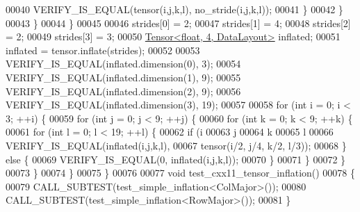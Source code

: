 \begin{DoxyCode}
00040           VERIFY\_IS\_EQUAL(tensor(i,j,k,l), no\_stride(i,j,k,l));
00041         \}
00042       \}
00043     \}
00044   \}
00045 
00046   strides[0] = 2;
00047   strides[1] = 4;
00048   strides[2] = 2;
00049   strides[3] = 3;
00050   \hyperlink{class_eigen_1_1_tensor}{Tensor<float, 4, DataLayout>} inflated;
00051   inflated = tensor.inflate(strides);
00052 
00053   VERIFY\_IS\_EQUAL(inflated.dimension(0), 3);
00054   VERIFY\_IS\_EQUAL(inflated.dimension(1), 9);
00055   VERIFY\_IS\_EQUAL(inflated.dimension(2), 9);
00056   VERIFY\_IS\_EQUAL(inflated.dimension(3), 19);
00057 
00058   \textcolor{keywordflow}{for} (\textcolor{keywordtype}{int} i = 0; i < 3; ++i) \{
00059     \textcolor{keywordflow}{for} (\textcolor{keywordtype}{int} j = 0; j < 9; ++j) \{
00060       \textcolor{keywordflow}{for} (\textcolor{keywordtype}{int} k = 0; k < 9; ++k) \{
00061         \textcolor{keywordflow}{for} (\textcolor{keywordtype}{int} l = 0; l < 19; ++l) \{
00062           \textcolor{keywordflow}{if} (i %
00063               j %
00064               k %
00065               l %
00066             VERIFY\_IS\_EQUAL(inflated(i,j,k,l),
00067                             tensor(i/2, j/4, k/2, l/3));
00068           \} \textcolor{keywordflow}{else} \{
00069             VERIFY\_IS\_EQUAL(0, inflated(i,j,k,l));
00070           \}
00071         \}
00072       \}
00073     \}
00074   \}
00075 \}
00076 
00077 \textcolor{keywordtype}{void} test\_cxx11\_tensor\_inflation()
00078 \{
00079   CALL\_SUBTEST(test\_simple\_inflation<ColMajor>());
00080   CALL\_SUBTEST(test\_simple\_inflation<RowMajor>());
00081 \}
\end{DoxyCode}
